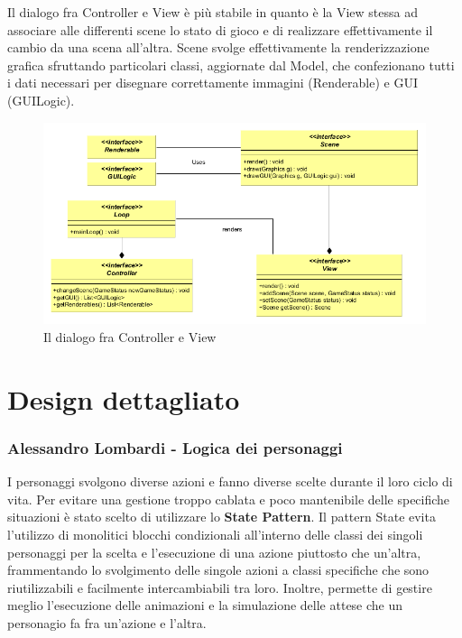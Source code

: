 \documentclass[a4paper,12pt]{report}
\begin{document}
Il dialogo fra Controller e View è più stabile in quanto è la View stessa ad associare alle differenti scene lo stato di gioco e di realizzare effettivamente il cambio da una scena all'altra. Scene svolge effettivamente la renderizzazione grafica sfruttando particolari classi, aggiornate dal Model, che confezionano tutti i dati necessari per disegnare correttamente immagini (Renderable) e GUI (GUILogic).

\begin{figure}[H]
\centering{}
\includegraphics[width=\linewidth]{img/ArchitetturaControllerView}
\caption{Il dialogo fra Controller e View}
\label{img:ControllerView}
\end{figure}

\section{Design dettagliato}

\begin{flushright}
\item\subsubsection{Alessandro Lombardi - Logica dei personaggi}
\end{flushright}

I personaggi svolgono diverse azioni e fanno diverse scelte durante il loro ciclo di vita. Per evitare una gestione troppo cablata e poco mantenibile delle specifiche situazioni è stato scelto di utilizzare lo \textbf{State Pattern}. Il pattern State evita l'utilizzo di monolitici  blocchi condizionali all'interno delle classi dei singoli personaggi per la scelta e l’esecuzione di una azione piuttosto che un’altra, frammentando lo svolgimento delle singole azioni a classi specifiche che sono riutilizzabili e facilmente intercambiabili tra loro. Inoltre, permette di gestire meglio l'esecuzione delle animazioni e la simulazione delle attese che un personagio fa fra un'azione e l'altra.
\end{document}
